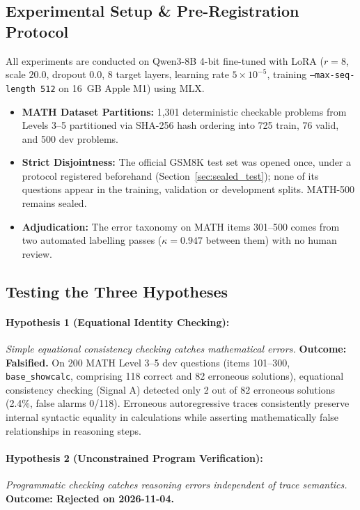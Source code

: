 \documentclass[11pt,a4paper]{article}
\begin{document}
\subsection{Experimental Setup \& Pre-Registration Protocol}
All experiments are conducted on Qwen3-8B 4-bit fine-tuned with LoRA ($r=8$, scale $20.0$, dropout $0.0$, 8 target layers, learning rate $5 \times 10^{-5}$, training \texttt{--max-seq-length 512} on 16~GB Apple M1) using MLX.
\begin{itemize}
    \item \textbf{MATH Dataset Partitions:} 1,301 deterministic checkable problems from Levels 3--5 partitioned via SHA-256 hash ordering into 725 train, 76 valid, and 500 dev problems.
    \item \textbf{Strict Disjointness:} The official GSM8K test set was opened once, under a protocol registered beforehand (Section~\ref{sec:sealed_test}); none of its questions appear in the training, validation or development splits. MATH-500 remains sealed.
    \item \textbf{Adjudication:} The error taxonomy on MATH items 301--500 comes from two automated labelling passes ($\kappa = 0.947$ between them) with no human review.
\end{itemize}

\subsection{Testing the Three Hypotheses}

\paragraph{Hypothesis 1 (Equational Identity Checking):}
\textit{Simple equational consistency checking catches mathematical errors.}
\textbf{Outcome: Falsified.} On 200 MATH Level 3--5 dev questions (items 101--300, \texttt{base\_showcalc}, comprising 118 correct and 82 erroneous solutions), equational consistency checking (Signal A) detected only 2 out of 82 erroneous solutions (2.4\%, false alarms 0/118). Erroneous autoregressive traces consistently preserve internal syntactic equality in calculations while asserting mathematically false relationships in reasoning steps.

\paragraph{Hypothesis 2 (Unconstrained Program Verification):}
\textit{Programmatic checking catches reasoning errors independent of trace semantics.}
\textbf{Outcome: Rejected on 2026-11-04.}
\end{document}
